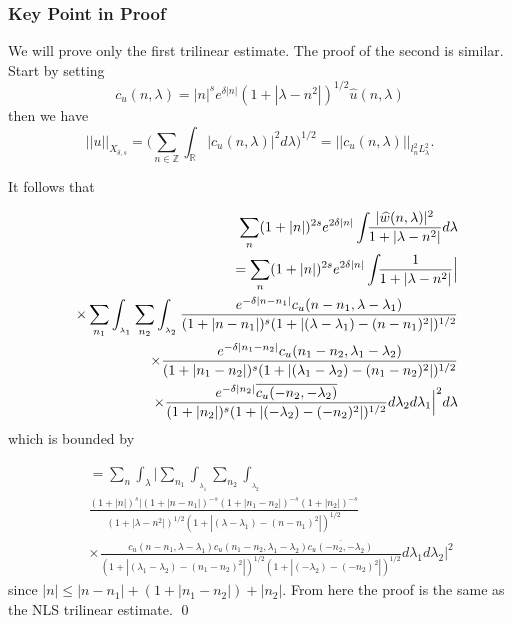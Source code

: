 \documentclass{beamer}
\numberwithin{equation}{section}
\begin{document}
%
%
\begin{frame}
  \frametitle{Key Point in Proof}
We will prove only the first trilinear estimate. The proof of the second is
similar. Start by setting
\begin{equation*}
c_u(n,\lambda)=|n|^s e^{\delta |n|}(1+|\lambda-n^2|)^{1/2}\widehat{u}(n,\lambda)
\end{equation*}
then we have
\begin{equation*}
||u||_{{X}_{\delta,s}}=\Big (\sum_{n\in \mathbb{{Z}}}\int_{\mathbb{R}}|c_u(n,\lambda)|^2d\lambda \Big )^{1/2}
=||c_u(n,\lambda)||_{l^2_nL^2_{\lambda}}.
\end{equation*}
\end{frame}
\begin{frame}
It follows that

\begin{eqnarray*}
&&\sum_{n } (1+|n|)^{2s}e^{2\delta |n|}
\int_{}
     \frac{|\widehat{w}(n, \lambda)|^2}{1+|\lambda -n^2|}
d\lambda
\\
&&
=\sum_{n  {}} (1+|n|)^{2s}e^{2\delta |n|}
\int_{}
     \frac{1}{1+|\lambda -n^2|}\Big \vert 
         \notag\\
&&
  \times  \sum_{n_1 {}}
     \int_{_{\lambda_1}}\sum_{n_2 {}}
     \int_{_{\lambda_2}}\frac{e^{-\delta |n-n_1|}c_u(n-n_1,\lambda-\lambda_1)}{(1+|n-n_1|)^s(1+|(\lambda-\lambda_1)-(n-n_1)^2|)^{1/2}}\notag\\
&&\times
\frac{e^{-\delta|n_1-n_2|}c_u(n_1-n_2,\lambda_1-\lambda_2)}{(1+|n_1-n_2|)^s(1+|(\lambda_1-\lambda_2)-(n_1-n_2)^2|)^{1/2}}
\\
&& \times \frac{e^{-\delta |n_2|}\overline{c_u(-n_2,-\lambda_2)}}{(1+|n_2|)^s(1+|(-\lambda_2)-(-n_2)^2|)^{1/2}}
d\lambda_2d\lambda_1 \Big \vert^2d\lambda
     \notag\\
   \end{eqnarray*}
   which is bounded by
 \end{frame}
   \begin{frame}
     \begin{eqnarray*}
      &&=\sum_{n  {}} 
\int_{\lambda}
     \Big \vert \sum_{n_1 {}}
     \int_{_{\lambda_1}}\sum_{n_2 {}}
     \int_{_{\lambda_2}}
     \\
     && \frac{(1 + |n|)^{s}|(1 + |n-n_1|)^{-s}(1 + |n_1-n_2|)^{-s}(1 + |n_2|)^{-s}}{(1+|\lambda -n^2|)^{1/2}(1+|(\lambda-\lambda_1)-(n-n_1)^2|)^{1/2}}\\
     &&\times \frac{c_u(n-n_1,\lambda-\lambda_1)c_u(n_1-n_2,\lambda_1-\lambda_2)\overline{c_u(-n_2,-\lambda_2)}}{(1+|(\lambda_1-\lambda_2)-(n_1-n_2)^2|)^{1/2}
     (1+|(-\lambda_2)-(-n_2)^2|)^{1/2}}d\lambda_1d\lambda_2 \Big \vert^2
\end{eqnarray*}
since $|n|\le |n-n_1|+(1+|n_1-n_2|)+|n_2|$.
From here the proof is the same as the NLS trilinear estimate. \qed
\end{frame}
\end{document}
